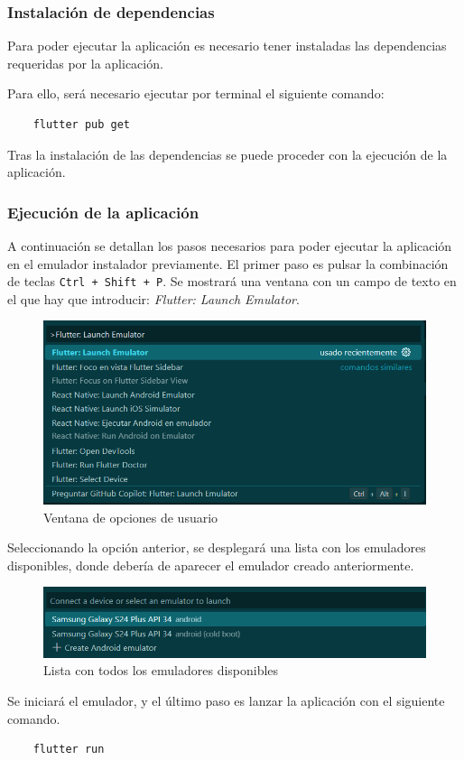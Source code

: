 \subsubsection{Instalación de dependencias}
Para poder ejecutar la aplicación es necesario tener instaladas las dependencias requeridas por la aplicación.

Para ello, será necesario ejecutar por terminal el siguiente comando:
\begin{verbatim}
    flutter pub get
\end{verbatim}

Tras la instalación de las dependencias se puede proceder con la ejecución de la aplicación.

\subsubsection{Ejecución de la aplicación}
A continuación se detallan los pasos necesarios para poder ejecutar la aplicación en el emulador instalador previamente.
El primer paso es pulsar la combinación de teclas \verb|Ctrl + Shift + P|. Se mostrará una ventana con un campo de texto en el que hay que introducir: \textit{Flutter: Launch Emulator}.
\begin{figure}[H]
    \centering
    \includegraphics[width=0.9\linewidth]{img/launch_emulator.png}
    \caption{Ventana de opciones de usuario}
    \label{fig:launch_emulator}
\end{figure}

Seleccionando la opción anterior, se desplegará una lista con los emuladores disponibles, donde debería de aparecer el emulador creado anteriormente.
\begin{figure}[H]
    \centering
    \includegraphics[width=0.9\linewidth]{img/lista_emuladores.png}
    \caption{Lista con todos los emuladores disponibles}
    \label{fig:lista_emuladores}
\end{figure}

Se iniciará el emulador, y el último paso es lanzar la aplicación con el siguiente comando.
\begin{verbatim}
    flutter run
\end{verbatim}